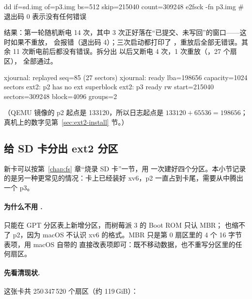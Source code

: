 \begin{shcode}
dd if=sd.img of=p3.img bs=512 skip=215040 count=309248
e2fsck -fn p3.img          # 退出码 0 表示没有任何错误
\end{shcode}

结果：第一轮随机断电 14 次，其中 3 次正好落在“已提交、未写回”的窗口——这时如果不重放， 会报错（退出码 4）；三次启动都打印了 ，重放后全部无错误。其余 11 次断电前后都没有错误。拆分出  以后又断电 4 次，1 次重放（，27 个扇区）， 全部通过。

\begin{txtcode}
xjournal: replayed seq=85 (27 sectors)
xjournal: ready lba=198656 capacity=1024 sectors
ext2: p2 has no ext superblock
ext2: p3 ready rw start=215040 sectors=309248 block=4096 groups=2
\end{txtcode}

（QEMU 镜像的 p2 起点是 133120，所以日志起点是 $133120 + 65536 = 198656$；真机上的数字见第~\ref{sec:ext2-install} 节。）

\subsection{给 SD 卡分出 ext2 分区}
\label{sec:ext2-part}

新卡可以按第~\ref{chap:fs} 章“烧录 SD 卡”一节，用  一次建好四个分区。本小节记录的是另一种更常见的情况：卡上已经装好 xv6，p2 一直占到卡尾，需要从中腾出一个 p3。

\paragraph{为什么不用 .}  只能在 GPT 分区表上新增分区，而树莓派 3 的 Boot ROM 只认 MBR； 也缩不了 p2，因为 macOS 不认识 xv6 的格式。MBR 只是第 0 扇区里的 4 个 16 字节表项，用 macOS 自带的  直接改表项即可：既不移动数据，也不重写分区里的任何扇区。

\paragraph{先看清现状.} 这张卡共 250\,347\,520 个扇区（约 119\,GiB）：


